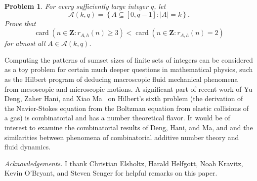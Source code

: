 \documentclass{amsart}
\newtheorem{problem}{Problem}
\newcommand{\bprob}{\begin{problem}}
\newcommand{\eprob}{\end{problem}}
\newcommand{\Z}{\ensuremath{\mathbf Z}}
\newcommand{\mca}{\ensuremath{ \mathcal A}}
\DeclareMathOperator{\card}{\text{card}}
\begin{document}
\bprob
For every sufficiently large integer $q$, let 
\[
\mca(k,q )= \left\{ A \subseteq [0,q-1]: |A| = k\right\}.
\]
Prove that 
\[
\card\left( n \in \Z: r_{A,h}(n) \geq 3 \right) 
< \card\left( n \in \Z: r_{A,h}(n) = 2 \right) 
\]
for almost all $A \in \mca(k,q)$. 
\eprob



Computing the patterns of sumset sizes of finite sets of integers can be considered as a toy problem for certain much deeper questions in 
mathematical physics, such as the Hilbert program of deducing 
macroscopic fluid mechanical phenomena from 
mesoscopic  and microscopic motions.  
A significant part  of recent work of Yu Deng,  
Zaher Hani, and Xiao Ma~\cite{deng-hani-ma25,slom25} 
on Hilbert's sixth problem (the derivation of the Navier-Stokes equation 
from the Boltzman  equation from elastic collisions of a gas) 
is combinatorial and has a number theoretical flavor.  
It would be of interest to examine the combinatorial results of 
Deng, Hani, and Ma, and and the similarities between phenomena 
of combinatorial additive number theory and fluid dynamics. 



\emph{Acknowledgements.}
I thank Christian Elsholtz, Harald Helfgott, Noah Kravitz, Kevin O'Bryant, 
and Steven Senger for helpful remarks on this paper. 
\end{document}
